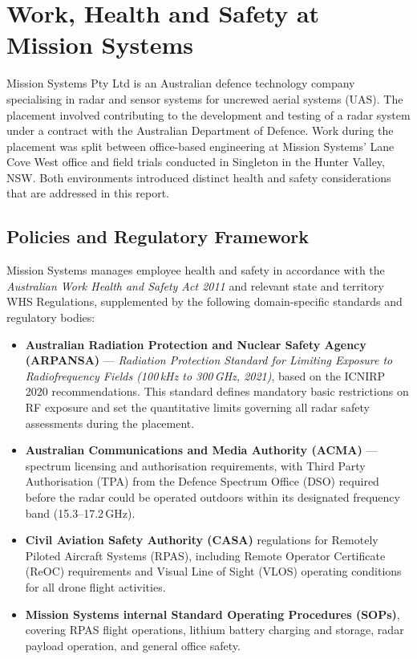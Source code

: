 \section*{Work, Health and Safety at Mission Systems}
 
Mission Systems Pty Ltd is an Australian defence technology company specialising in radar and
sensor systems for uncrewed aerial systems (UAS). The placement involved contributing to the
development and testing of a radar system under a contract with the Australian 
Department of Defence. Work during the placement was split between office-based
engineering at Mission Systems' Lane Cove West office and field trials conducted in
Singleton in the Hunter Valley, NSW. Both environments introduced distinct
health and safety considerations that are addressed in this report.
 
\subsection*{Policies and Regulatory Framework}
 
Mission Systems manages employee health and safety in accordance with the
\textit{Australian Work Health and Safety Act 2011} and relevant state and territory WHS
Regulations, supplemented by the following domain-specific standards and regulatory bodies:
 
\begin{itemize}
    \item \textbf{Australian Radiation Protection and Nuclear Safety Agency (ARPANSA)} ---
    \textit{Radiation Protection Standard for Limiting Exposure to Radiofrequency Fields
    (100\,kHz to 300\,GHz, 2021)}, based on the ICNIRP 2020 recommendations. This standard
    defines mandatory basic restrictions on RF exposure and set the quantitative limits
    governing all radar safety assessments during the placement.
 
    \item \textbf{Australian Communications and Media Authority (ACMA)} --- spectrum licensing
    and authorisation requirements, with Third Party Authorisation (TPA) from the Defence
    Spectrum Office (DSO) required before the radar could be operated outdoors within its
    designated frequency band (15.3--17.2\,GHz).
 
    \item \textbf{Civil Aviation Safety Authority (CASA)} regulations for Remotely Piloted
    Aircraft Systems (RPAS), including Remote Operator Certificate (ReOC) requirements and
    Visual Line of Sight (VLOS) operating conditions for all drone flight activities.
 
    \item \textbf{Mission Systems internal Standard Operating Procedures (SOPs)}, covering
    RPAS flight operations, lithium battery charging and storage, radar payload operation, and
    general office safety.
\end{itemize}
 
